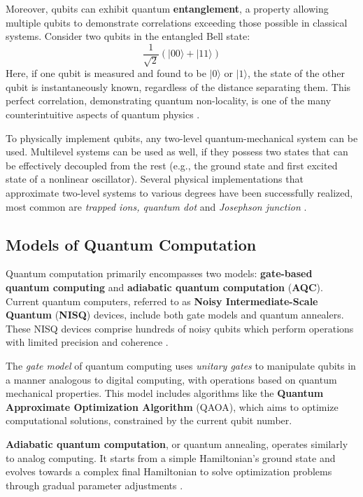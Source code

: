 Moreover, qubits can exhibit quantum \textbf{entanglement}, a property allowing multiple qubits to demonstrate correlations exceeding those possible in classical systems. Consider two qubits in the entangled Bell state:
\begin{equation}
    \frac{1}{\sqrt{2}}(|00\rangle + |11\rangle)
\end{equation}
Here, if one qubit is measured and found to be \(|0\rangle\) or \(|1\rangle\), the state of the other qubit is instantaneously known, regardless of the distance separating them. This perfect correlation, demonstrating quantum non-locality, is one of the many counterintuitive aspects of quantum physics \cite{QAMUD}.

To physically implement qubits, any two-level quantum-mechanical system can be used. Multilevel systems can be used as well, if they possess two states that can be effectively decoupled from the rest (e.g., the ground state and first excited state of a nonlinear oscillator). Several physical implementations that approximate two-level systems to various degrees have been successfully realized, most common are \textit{trapped ions, quantum dot} and \textit{Josephson junction} \cite{Preskill2018}.



\subsection{Models of Quantum Computation}

Quantum computation primarily encompasses two models: \textbf{gate-based quantum computing} and \textbf{adiabatic quantum computation} (\textbf{AQC}). Current quantum computers, referred to as \textbf{Noisy Intermediate-Scale Quantum} (\textbf{NISQ}) devices, include both gate models and quantum annealers. These NISQ devices comprise hundreds of noisy qubits which perform operations with limited precision and coherence \cite{Preskill2018}.

The \textit{gate model} of quantum computing uses \textit{unitary gates} to manipulate qubits in a manner analogous to digital computing, with operations based on quantum mechanical properties. This model includes algorithms like the \textbf{Quantum Approximate Optimization Algorithm} (QAOA), which aims to optimize computational solutions, constrained by the current qubit number.

\textbf{Adiabatic quantum computation}, or quantum annealing, operates similarly to analog computing. It starts from a simple Hamiltonian's ground state and evolves towards a complex final Hamiltonian to solve optimization problems through gradual parameter adjustments \cite{Farhi2001}.

